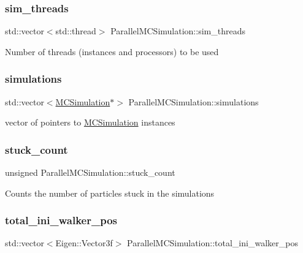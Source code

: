\subsubsection{\texorpdfstring{sim\+\_\+threads}{sim\_threads}}
{\footnotesize\ttfamily std\+::vector$<$std\+::thread$>$ Parallel\+M\+C\+Simulation\+::sim\+\_\+threads}

Number of threads (instances and processors) to be used \mbox{\label{class_parallel_m_c_simulation_af16d292f007b8391122a035022422ed5}} 
\subsubsection{\texorpdfstring{simulations}{simulations}}
{\footnotesize\ttfamily std\+::vector$<$\hyperlink{class_m_c_simulation}{M\+C\+Simulation}$\ast$$>$ Parallel\+M\+C\+Simulation\+::simulations}

vector of pointers to \hyperlink{class_m_c_simulation}{M\+C\+Simulation} instances \mbox{\label{class_parallel_m_c_simulation_a6ee1dfd6e695ec5ec7d4c2ed94f233cf}} 
\subsubsection{\texorpdfstring{stuck\+\_\+count}{stuck\_count}}
{\footnotesize\ttfamily unsigned Parallel\+M\+C\+Simulation\+::stuck\+\_\+count}

Counts the number of particles stuck in the simulations \mbox{\label{class_parallel_m_c_simulation_a5efe5faa45e57e6ff3827e9ec9e52a64}} 
\subsubsection{\texorpdfstring{total\+\_\+ini\+\_\+walker\+\_\+pos}{total\_ini\_walker\_pos}}
{\footnotesize\ttfamily std\+::vector$<$Eigen\+::\+Vector3f$>$ Parallel\+M\+C\+Simulation\+::total\+\_\+ini\+\_\+walker\+\_\+pos}

